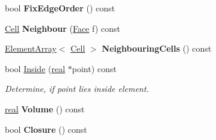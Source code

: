 \begin{DoxyCompactItemize}
\item 
\hypertarget{classINMOST_1_1Cell_a84eaa268f8c3886e1164ea14715f2419}{bool {\bfseries Fix\-Edge\-Order} () const }\label{classINMOST_1_1Cell_a84eaa268f8c3886e1164ea14715f2419}

\item 
\hypertarget{classINMOST_1_1Cell_ac835f99e4a99a2a94fec5e041145d8df}{\hyperlink{classINMOST_1_1Cell}{Cell} {\bfseries Neighbour} (\hyperlink{classINMOST_1_1Face}{Face} f) const }\label{classINMOST_1_1Cell_ac835f99e4a99a2a94fec5e041145d8df}

\item 
\hypertarget{classINMOST_1_1Cell_a47bc37b5c0fc45e2536f78787280fb4d}{\hyperlink{classINMOST_1_1ElementArray}{Element\-Array}$<$ \hyperlink{classINMOST_1_1Cell}{Cell} $>$ {\bfseries Neighbouring\-Cells} () const }\label{classINMOST_1_1Cell_a47bc37b5c0fc45e2536f78787280fb4d}

\item 
bool \hyperlink{classINMOST_1_1Cell_a06c7320fcbc00ede688cb56ade66f785}{Inside} (\hyperlink{classINMOST_1_1Storage_a853346784b4a5822a7fac54d8f10f805}{real} $\ast$point) const 
\begin{DoxyCompactList}\small\item\em Determine, if point lies inside element. \end{DoxyCompactList}\item 
\hypertarget{classINMOST_1_1Cell_ae0caec87803ddd108c4fb06decf69e18}{\hyperlink{classINMOST_1_1Storage_a853346784b4a5822a7fac54d8f10f805}{real} {\bfseries Volume} () const }\label{classINMOST_1_1Cell_ae0caec87803ddd108c4fb06decf69e18}

\item 
\hypertarget{classINMOST_1_1Cell_af07f9b3de49505cbe634c32882af2ac1}{bool {\bfseries Closure} () const }\label{classINMOST_1_1Cell_af07f9b3de49505cbe634c32882af2ac1}

\end{DoxyCompactItemize}
